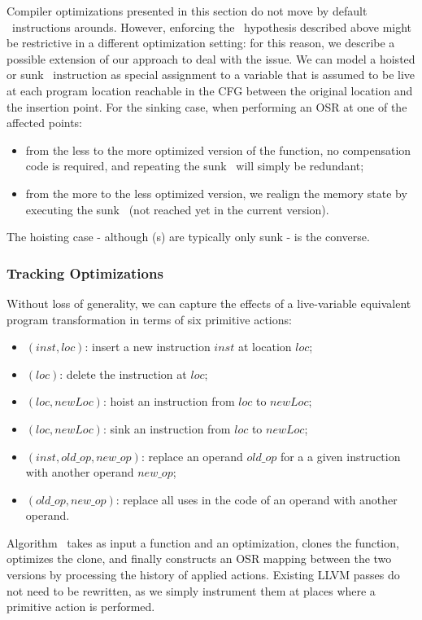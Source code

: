 Compiler optimizations presented in this section do not move by default \store\ instructions arounds. However, enforcing the \store\ hypothesis described above might be restrictive in a different optimization setting: for this reason, we describe a possible extension of our approach to deal with the issue. We can model a hoisted or sunk \store\ instruction as special assignment to a variable that is assumed to be live at each program location reachable in the CFG between the original location and the insertion point. For the sinking case, when performing an OSR at one of the affected points:
\begin{itemize}[itemsep=0pt,parsep=3pt,partopsep=0pt]
 \item from the less to the more optimized version of the function, no compensation code is required, and repeating the sunk \store\ will simply be redundant;
 \item from the more to the less optimized version, we realign the memory state by executing the sunk \store\ (not reached yet in the current version).
\end{itemize}
The hoisting case - although \store(s) are typically only sunk - is the converse.

\subsubsection*{Tracking Optimizations}
Without loss of generality, we can capture the effects of a live-variable equivalent program transformation in terms of six primitive actions:
\begin{itemize}[parsep=0pt,partopsep=0pt]
 \item {}$(inst, loc)$: insert a new instruction $inst$ at location $loc$;
 \item {}$(loc)$: delete the instruction at $loc$; 
 \item {}$(loc, newLoc)$: hoist an instruction from $loc$ to $newLoc$;
 \item {}$(loc, newLoc)$: sink an instruction from $loc$ to $newLoc$;
 \item {}$(inst, old\_op, new\_op)$: replace an operand $old\_op$ for a a given instruction with another operand $new\_op$;
 \item {}$(old\_op, new\_op)$: replace all uses in the code of an operand with another operand.
\end{itemize}

\noindent Algorithm \apply\ takes as input a function and an optimization, clones the function, optimizes the clone, and finally constructs an OSR mapping between the two versions by processing the history of applied actions. Existing LLVM passes do not need to be rewritten, as we simply instrument them at places where a primitive action is performed.


